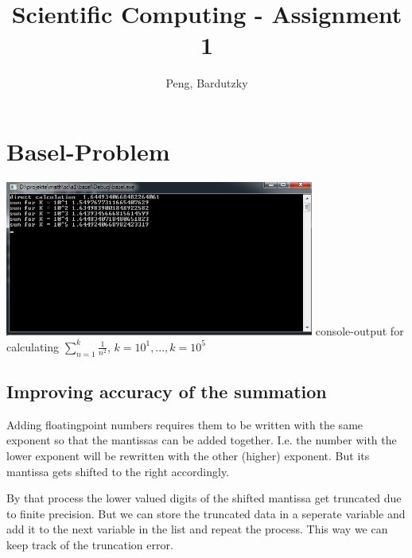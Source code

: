 \documentclass{article}
\begin{document}
\title{Scientific Computing - Assignment 1}
\author{Peng, Bardutzky}

\section{Basel-Problem}

\begin{center}

    \includegraphics[width=4.0in]{basel.jpeg}
    \label{simulationfigure}
    console-output for calculating $\sum_{n=1}^{k} \frac{1}{n^2}$, $k=10^1,...,k=10^5$
\end{center}


\subsection{Improving accuracy of the summation}
Adding floatingpoint numbers requires them to be written with the same exponent so that the mantissas can be added together. I.e. the number with the lower exponent will be rewritten with the other (higher) exponent. But its mantissa gets shifted to the right accordingly.

By that process the lower valued digits of the shifted mantissa get truncated due to finite precision.
But we can store the truncated data in a seperate variable and add it to the next variable in the list and repeat the process. This way we can keep track of the truncation error.
\end{document}
